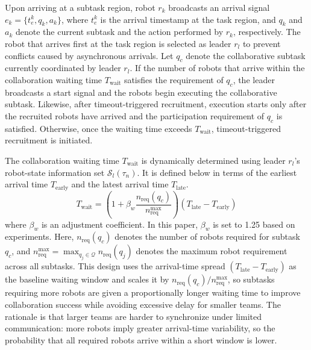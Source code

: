 \documentclass[lettersize,journal]{IEEEtran}
\begin{document}
Upon arriving at a subtask region, robot $r_k$ broadcasts an arrival signal $e_k = \{t_e^k, q_k, a_k\}$, where $t_e^k$ is the arrival timestamp at the task region, and $q_k$ and $a_k$ denote the current subtask and the action performed by $r_k$, respectively. The robot that arrives first at the task region is selected as leader $r_l$ to prevent conflicts caused by asynchronous arrivals. Let $q_c$ denote the collaborative subtask currently coordinated by leader $r_l$. If the number of robots that arrive within the collaboration waiting time $T_\mathrm{wait}$ satisfies the requirement of $q_c$, the leader broadcasts a start signal and the robots begin executing the collaborative subtask. Likewise, after timeout-triggered recruitment, execution starts only after the recruited robots have arrived and the participation requirement of $q_c$ is satisfied. Otherwise, once the waiting time exceeds $T_\mathrm{wait}$, timeout-triggered recruitment is initiated.


The collaboration waiting time $T_\mathrm{wait}$ is dynamically determined using leader $r_l$'s robot-state information set $\mathcal{S}_l(\tau_n)$. It is defined below in terms of the earliest arrival time $T_\mathrm{early}$ and the latest arrival time $T_\mathrm{late}$.
\begin{equation}\label{col}
T_\mathrm{wait} = \left(1 + \beta_w\frac{n_{\mathrm{req}}(q_c)}{n_{\mathrm{req}}^{\max}}\right)(T_\mathrm{late}-T_\mathrm{early})
\end{equation}
where $\beta_w$ is an adjustment coefficient. In this paper, $\beta_w$ is set to 1.25 based on experiments. Here, $n_{\mathrm{req}}(q_c)$ denotes the number of robots required for subtask $q_c$, and $n_{\mathrm{req}}^{\max}=\max_{q_j\in\mathcal{Q}} n_{\mathrm{req}}(q_j)$ denotes the maximum robot requirement across all subtasks. This design uses the arrival-time spread $(T_\mathrm{late}-T_\mathrm{early})$ as the baseline waiting window and scales it by $n_{\mathrm{req}}(q_c)/n_{\mathrm{req}}^{\max}$, so subtasks requiring more robots are given a proportionally longer waiting time to improve collaboration success while avoiding excessive delay for smaller teams. The rationale is that larger teams are harder to synchronize under limited communication: more robots imply greater arrival-time variability, so the probability that all required robots arrive within a short window is lower.
\end{document}
